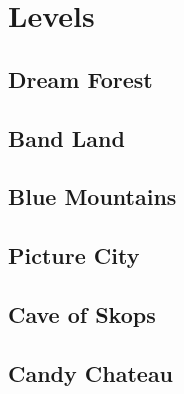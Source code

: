 \chapter{Levels}
\label{cha:levels}
\section{Dream Forest}
\label{sec:dream-forest}





\section{Band Land}
\label{sec:band-land}





\section{Blue Mountains}
\label{sec:blue-mountains}




\section{Picture City}
\label{sec:picture-city}




\section{Cave of Skops}
\label{sec:cave-of-skops}




\section{Candy Chateau}
\label{sec:candy-chateau}



